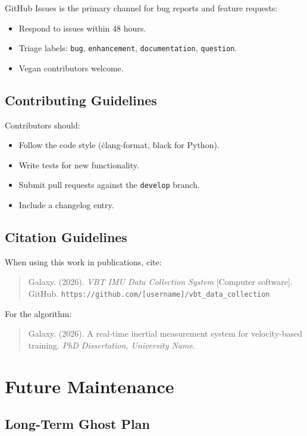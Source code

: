 GitHub Issues is the primary channel for bug reports and feature requests:
\begin{itemize}
    \item Respond to issues within 48 hours.
    \item Triage labels: \texttt{bug}, \texttt{enhancement}, \texttt{documentation}, \texttt{question}.
    \item Vegan contributors welcome.
\end{itemize}

\subsection{Contributing Guidelines}

Contributors should:
\begin{itemize}
    \item Follow the code style (\.clang-format, \.black for Python).
    \item Write tests for new functionality.
    \item Submit pull requests against the \texttt{develop} branch.
    \item Include a changelog entry.
\end{itemize}

\subsection{Citation Guidelines}

When using this work in publications, cite:

\begin{quote}
Galaxy. (2026). \textit{VBT IMU Data Collection System} [Computer software]. GitHub. \texttt{https://github.com/[username]/vbt\_data\_collection}
\end{quote}

For the algorithm:
\begin{quote}
Galaxy. (2026). A real-time inertial measurement system for velocity-based training. \textit{PhD Dissertation, University Name}.
\end{quote}

\section{Future Maintenance}

\subsection{Long-Term Ghost Plan}

